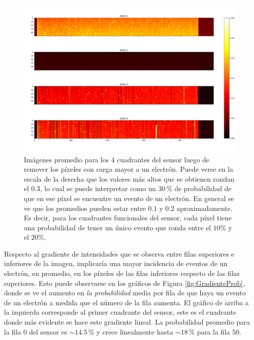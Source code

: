 \begin{figure}[h]
    \centering
    \includegraphics[scale=0.4]{Figs/1ePromedio.pdf}
    \caption{Imágenes promedio para los $4$ cuadrantes del sensor luego de remover los píxeles con carga mayor a un electrón. Puede verse en la escala de la derecha que los valores más altos que se obtienen rondan el $0.3$, lo cual se puede interpretar como un $30\,\%$ de probabilidad de que en ese píxel se encuentre un evento de un electrón. En general se ve que los promedios pueden estar entre $0.1$ y $0.2$ aproximadamente. Es decir, para los cuadrantes funcionales del sensor, cada píxel tiene una probabilidad de tener un único evento que ronda entre el $10\%$ y el $20\%$.}
    \label{fig:Eventos1e}
\end{figure}
Respecto al gradiente de intensidades que se observa entre filas superiores e inferiores de la imagen, implicaría una mayor incidencia de eventos de un electrón, en promedio, en los píxeles de las filas inferiores respecto de las filas superiores. 
Esto puede observarse en los gráficos de Figura \ref{fig:GradienteProb}, donde se ve el aumento en \textit{la probabilidad} media por fila de que haya un evento de un electrón a medida que el número de la fila aumenta. El gráfico de arriba a la izquierda corresponde al primer cuadrante del sensor, este es el cuadrante donde más evidente se hace este gradiente lineal. La probabilidad promedio para la fila $0$ del sensor es $\sim 14.5\,\%$ y crece linealmente hasta $\sim 18\,\%$ para la fila $50$. 
